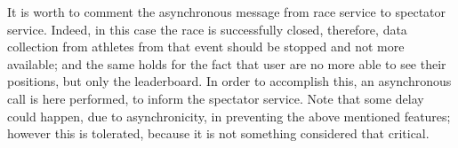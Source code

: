 It is worth to comment the asynchronous message from race service to spectator service. 
Indeed, in this case the race is successfully closed, therefore, data collection from athletes from that event should be stopped and not 
more available; and the same holds for the fact that user are no more able to see their positions, but only the leaderboard.
In order to accomplish this, an asynchronous call is here performed, to inform the spectator service. 
Note that some delay could happen, due to asynchronicity, in preventing the above mentioned features; however this is tolerated, because
it is not something considered that critical.